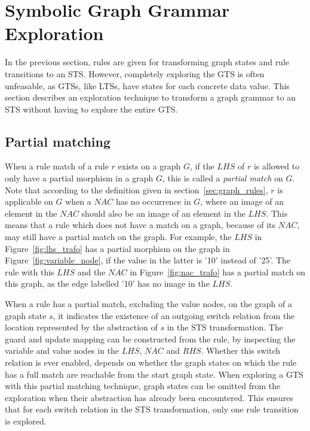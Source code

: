 \section{Symbolic Graph Grammar Exploration}\label{sec:gg-exploration}

In the previous section, rules are given for transforming graph states and rule transitions to an STS. However, completely exploring the GTS is often unfeasable, as GTSs, like LTSs, have states for each concrete data value. This section describes an exploration technique to transform a graph grammar to an STS without having to explore the entire GTS.

\subsection{Partial matching}\label{sec:partial-matching}
When a rule match of a rule $r$ exists on a graph $G$, if the $\mathit{LHS}$ of $r$ is allowed to only have a partial morphism in a graph $G$, this is called a \textit{partial match} on $G$. Note that according to the definition given in section~\ref{sec:graph_rules}, $r$ is applicable on $G$ when a $\mathit{NAC}$ has no occurrence in $G$, where an image of an element in the $\mathit{NAC}$ should also be an image of an element in the $\mathit{LHS}$. This means that a rule which does not have a match on a graph, because of its $\mathit{NAC}$, may still have a partial match on the graph. For example, the $\mathit{LHS}$ in Figure~\ref{fig:lhs_trafo} has a partial morphism on the graph in Figure~\ref{fig:variable_node}, if the value in the latter is '10' instead of '25'. The rule with this $\mathit{LHS}$ and the $\mathit{NAC}$ in Figure~\ref{fig:nac_trafo} has a partial match on this graph, as the edge labelled '10' has no image in the $\mathit{LHS}$.

When a rule has a partial match, excluding the value nodes, on the graph of a graph state $s$, it indicates the existence of an outgoing switch relation from the location represented by the abstraction of $s$ in the STS transformation. The guard and update mapping can be constructed from the rule, by inspecting the variable and value nodes in the $\mathit{LHS}$, $\mathit{NAC}$ and $\mathit{RHS}$. Whether this switch relation is ever enabled, depends on whether the graph states on which the rule has a full match are reachable from the start graph state. When exploring a GTS with this partial matching technique, graph states can be omitted from the exploration when their abstraction has already been encountered. This ensures that for each switch relation in the STS transformation, only one rule transition is explored.

